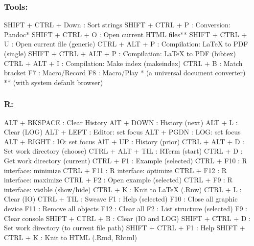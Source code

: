 \newpage
\subsubsection{Tools:}

\vspace{-0.5cm}
\begin{Rtables}[caption={[Tools menu keyboard shortcuts]
    ToolsMenu keyboard shortcuts},
  label=menu:tools]
  SHIFT + CTRL + Down    : Sort strings
  SHIFT + CTRL + P       : Conversion: Pandoc*
  SHIFT + CTRL + O       : Open current HTML files**
  SHIFT + CTRL + U       : Open current file (generic)
  CTRL  + ALT  + P       : Compilation: LaTeX to PDF (single)
  SHIFT + CTRL + ALT + P : Compilation: LaTeX to PDF (bibtex)
  CTRL  + ALT  + I       : Compilation: Make index (makeindex)
  CTRL  + B              : Match bracket
  F7                     : Macro/Record
  F8                     : Macro/Play
  *  (a universal document converter)
  ** (with system default browser)
\end{Rtables}


\subsubsection{R:}

\vspace{-0.5cm}
\begin{Rtables}[caption={[R menu keyboard shortcuts]
    R menu keyboard shortcuts},
  label=menu:r]
  ALT  + BKSPACE    : Clear History
  AlT  + DOWN       : History (next)
  ALT  + L          : Clear (LOG)
  ALT  + LEFT       : Editor: set focus
  ALT  + PGDN       : LOG: set focus
  ALT  + RIGHT      : IO: set focus
  AlT  + UP         : History (prior)
  CTRL + ALT  + D   : Set work directory (choose)
  CTRL + ALT + TIL  : RTerm (start)
  CTRL + D          : Get work directory (current)
  CTRL + F1         : Example (selected)
  CTRL + F10        : R interface: minimize
  CTRL + F11        : R interface: optimize
  CTRL + F12        : R interface: maximize
  CTRL + F2         : Open example (selected)
  CTRL + F9         : R interface: visible (show/hide)
  CTRL + K          : Knit to LaTeX (.Rnw)
  CTRL + L          : Clear (IO)
  CTRL + TIL        : Sweave
  F1                : Help (selected)
  F10               : Close all graphic device
  F11               : Remove all objects
  F12               : Clear all
  F2                : List structure (selected)
  F9                : Clear console
  SHIFT + CTRL + B  : Clear (IO and LOG)
  SHIFT + CTRL + D  : Set work directory (to current file path)
  SHIFT + CTRL + F1 : Help
  SHIFT + CTRL + K  : Knit to HTML (.Rmd, Rhtml)
\end{Rtables}



